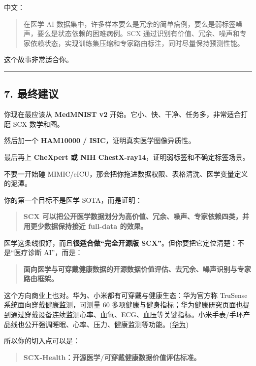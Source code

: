 \documentclass[
  12pt,
]{ctexart}
\begin{document}
中文：

\begin{quote}
在医学 AI
数据集中，许多样本要么是冗余的简单病例，要么是弱标签噪声，要么是状态依赖的困难病例。SCX
通过识别有价值、冗余、噪声和专家依赖状态，实现训练集压缩和专家路由标注，同时尽量保持预测性能。
\end{quote}

这个故事非常适合你。

\begin{center}\rule{0.5\linewidth}{0.5pt}\end{center}

\subsection{7. 最终建议}\label{ux6700ux7ec8ux5efaux8bae-2}

你现在最应该从 \textbf{MedMNIST v2}
开始。它小、快、干净、任务多，非常适合打磨 SCX 数学和图。

然后加一个 \textbf{HAM10000 / ISIC}，证明真实医学图像异质性。

最后再上 \textbf{CheXpert 或 NIH
ChestX-ray14}，证明弱标签和不确定标签场景。

不要一开始碰
MIMIC/eICU，那会把你拖进数据权限、表格清洗、医学变量定义的泥潭。

你的第一个目标不是医学 SOTA，而是证明：

\begin{quote}
\textbf{SCX
可以把公开医学数据划分为高价值、冗余、噪声、专家依赖四类，并用更少数据保持接近
full-data 的效果。}
\end{quote}

医学这条线很好，而且\textbf{很适合做``完全开源版
SCX''}。但你要把它定位清楚：不是``医疗诊断 AI''，而是：

\begin{quote}
\textbf{面向医学与可穿戴健康数据的开源数据价值评估、去冗余、噪声识别与专家路由框架。}
\end{quote}

这个方向商业上也对。华为、小米都有可穿戴与健康生态：华为官方称 TruSense
系统面向穿戴健康监测，可测量 60
多项健康与健身指标；华为健康研究页面也提到通过穿戴设备连续监测心率、血氧、ECG、血压等关键指标。小米手表/手环产品线也公开强调睡眠、心率、压力、健康监测等功能。(\href{https://arxiv.org/html/2406.17557v1?utm_source=chatgpt.com}{华为})

所以你的切入点可以是：

\begin{quote}
\textbf{SCX-Health：开源医学/可穿戴健康数据价值评估标准。}
\end{quote}
\end{document}
